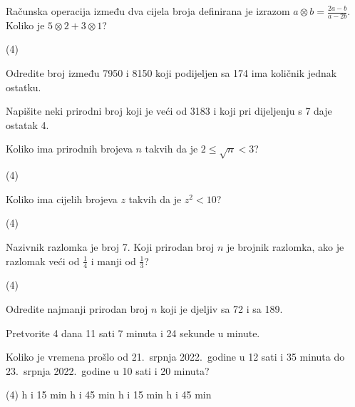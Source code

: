 \begin{zadatak}
	Računska operacija između dva cijela broja definirana je izrazom $\displaystyle a \otimes b = \frac{2a-b}{a-2b}$.
	Koliko je $5 \otimes 2 + 3 \otimes 1$?
    \begin{tasks}(4)
	\end{tasks}
\end{zadatak}

\begin{zadatak}
	Odredite broj između 7950 i 8150 koji podijeljen sa 174 ima količnik jednak ostatku.
\end{zadatak}

\begin{zadatak}
	Napišite neki prirodni broj koji je veći od 3183 i koji pri dijeljenju s 7 daje ostatak 4.
\end{zadatak}

\begin{zadatak}
	Koliko ima prirodnih brojeva $n$ takvih da je $2 \leq \sqrt{n} < 3$?
    \begin{tasks}(4)
	\end{tasks}
\end{zadatak}

\begin{zadatak}
	Koliko ima cijelih brojeva $z$ takvih da je $z^2 < 10$?
    \begin{tasks}(4)
	\end{tasks}
\end{zadatak}

\begin{zadatak}
	Nazivnik razlomka je broj 7.
	Koji prirodan broj $n$ je brojnik razlomka, ako je razlomak veći od $\displaystyle \frac{1}{4}$ i manji od $\displaystyle \frac{1}{3}$?
    \begin{tasks}(4)
	\end{tasks}
\end{zadatak}

\begin{zadatak}
	Odredite najmanji prirodan broj $n$ koji je djeljiv sa 72 i sa 189.
\end{zadatak}

\begin{zadatak}
	Pretvorite 4 dana 11 sati 7 minuta i 24 sekunde u minute.
\end{zadatak}

\begin{zadatak}
	Koliko je vremena prošlo od 21.\ srpnja 2022.\ godine u 12 sati i 35 minuta do 23.\ srpnja 2022.\ godine u 10 sati i 20 minuta?
    \begin{tasks}(4)
		 h i 15 min
		 h i 45 min
		 h i 15 min
		 h i 45 min
	\end{tasks}
\end{zadatak}

